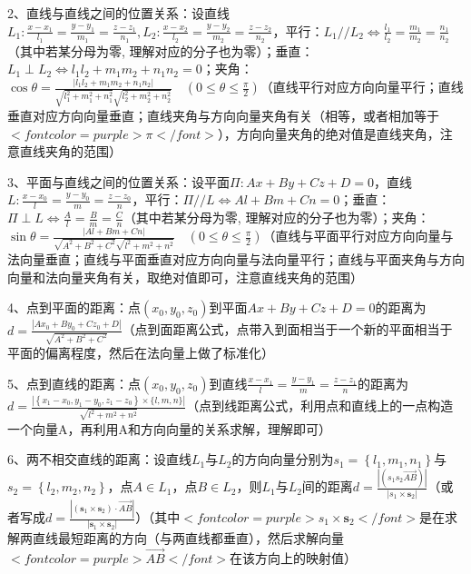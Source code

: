 2、直线与直线之间的位置关系：设直线$ L_{1}: \frac{x-x_{1}}{l_{1}}=\frac{y-y_{1}}{m_{1}}=\frac{z-z_{1}}{n_{1}},L_{2}: \frac{x-x_{2}}{l_{2}}=\frac{y-y_{2}}{m_{2}}=\frac{z-z_{2}}{n_{2}} $，平行：$ L_{1} / / L_{2} \Leftrightarrow \frac{l_{1}}{l_{2}}=\frac{m_{1}}{m_{2}}=\frac{n_{1}}{n_{2}} $（其中若某分母为零, 理解对应的分子也为零）；垂直：$ L_{1} \perp L_{2} \Leftrightarrow l_{1} l_{2}+m_{1} m_{2}+n_{1} n_{2}=0 $；夹角：$ \cos \theta=\frac{\left|l_{1} l_{2}+m_{1} m_{2}+n_{1} n_{2}\right|}{\sqrt{l_{1}^{2}+m_{1}^{2}+n_{1}^{2}} \sqrt{l_{2}^{2}+m_{2}^{2}+n_{2}^{2}}} \quad\left(0 \leqslant \theta \leqslant \frac{\pi}{2}\right) $（直线平行对应方向向量平行；直线垂直对应方向向量垂直；直线夹角与方向向量夹角有关（相等，或者相加等于$ <font color=purple>\pi</font> $），方向向量夹角的绝对值是直线夹角，注意直线夹角的范围）

3、平面与直线之间的位置关系：设平面$ \Pi: A x+B y+C z+D=0 $，直线$ L: \frac{x-x_{0}}{l}=\frac{y-y_{0}}{m}=\frac{z-z_{0}}{n} $，平行：$ \Pi / / L \Leftrightarrow A l+B m+C n=0 $；垂直：$ \Pi \perp L \Leftrightarrow \frac{A}{l}=\frac{B}{m}=\frac{C}{n} $（其中若某分母为零, 理解对应的分子也为零）；夹角：$ \sin \theta=\frac{|A l+B m+C n|}{\sqrt{A^{2}+B^{2}+C^{2}} \sqrt{l^{2}+m^{2}+n^{2}}} \quad\left(0 \leqslant \theta \leqslant \frac{\pi}{2}\right) $（直线与平面平行对应方向向量与法向量垂直；直线与平面垂直对应方向向量与法向量平行；直线与平面夹角与方向向量和法向量夹角有关，取绝对值即可，注意直线夹角的范围）

4、点到平面的距离：点$ \left(x_{0}, y_{0}, z_{0}\right) $到平面$ A x+B y+C z+D=0 $的距离为$ d=\frac{\left|A x_{0}+B y_{0}+C z_{0}+D\right|}{\sqrt{A^{2}+B^{2}+C^{2}}} $（点到面距离公式，点带入到面相当于一个新的平面相当于平面的偏离程度，然后在法向量上做了标准化）

5、点到直线的距离：点$ \left(x_{0}, y_{0}, z_{0}\right) $到直线$ \frac{x-x_{1}}{l}=\frac{y-y_{1}}{m}=\frac{z-z_{1}}{n} $的距离为$ d=\frac{\left|\left\{x_{1}-x_{0}, y_{1}-y_{0}, z_{1}-z_{0}\right\} \times\{l, m, n\}\right|}{\sqrt{l^{2}+m^{2}+n^{2}}} $（点到线距离公式，利用点和直线上的一点构造一个向量A，再利用A和方向向量的关系求解，理解即可）

6、两不相交直线的距离：设直线$ L_{1} $与$ L_{2} $的方向向量分别为$ s_{1}=\left\{l_{1}, m_{1}, n_{1}\right\} $与$ s_{2}=\left\{l_{2}, m_{2}, n_{2}\right\} $，点$ A \in L_{1} $，点$ B \in L_{2} $，则$ L_{1} $与$ L_{2} $间的距离$ d=\frac{\left|\left(s_{1} s_{2} \overrightarrow{A B}\right)\right|}{\left|s_{1} \times \boldsymbol{s}_{2}\right|} $（或者写成$ d=\frac{\left|\left(\boldsymbol{s}_{1} \times \boldsymbol{s}_{2}\right) \cdot \overrightarrow{A B}\right|}{\left|\boldsymbol{s}_{1} \times \boldsymbol{s}_{2}\right|} $）（其中$ <font color=purple>s_{1} \times \boldsymbol{s}_{2}</font> $是在求解两直线最短距离的方向（与两直线都垂直），然后求解向量$ <font color=purple>\overrightarrow{A B}</font> $在该方向上的映射值）

